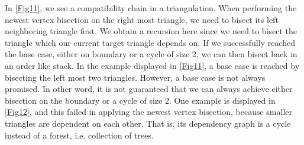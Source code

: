     In \ref{Fig11}, we see a compatibility chain in a triangulation. When performing the newest vertex bisection on the right most triangle, we need to bisect its left neighboring triangle first. We obtain a recursion here since we need to bisect the triangle which our current target triangle depends on. If we successfully reached the base case, either on boundary or a cycle of size 2, we can then bisect back in an order like stack. In the example displayed in \ref{Fig11}, a base case is reached by bisecting the left most two triangles. However, a base case is not always promised. In other word, it is not guaranteed that we can always achieve either bisection on the boundary or a cycle of size 2. One example is displayed in \ref{Fig12}, and this failed in applying the newest vertex bisection, because smaller triangles are dependent on each other. That is, its dependency graph is a cycle instead of a forest, i.e. collection of trees.

